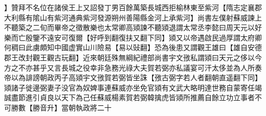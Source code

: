 】贊拜不名位在諸侯王上又詔發丁男百餘萬築長城西拒榆林東至紫河【隋志定襄郡大利縣有隂山有紫河通典紫河發源朔州善陽縣金河上承紫河】尚書左僕射蘇威諫上不聽築之二旬而畢帝之徵散樂也太常卿高熲諫不聽熲退謂太常丞李懿曰周天元以好樂而亡殷鑒不遠安可復爾【好呼到翻復扶又翻下同】熲又以帝遇啟民過厚謂太府卿何稠曰此虜頗知中國虚實山川險易【易以䜴翻】恐為後患又謂觀王雄曰【雄自安德郡王改封觀王觀古玩翻】近來朝廷殊無綱紀禮部尚書宇文㢸私謂熲曰天元之侈以今方之不亦甚乎又言長城之役幸非急務光祿大夫賀若弼亦私議宴可汗太侈並為人所奏帝以為誹謗朝政丙子高熲宇文㢸賀若弼皆坐誅【㢸古弼字若人者翻朝直遥翻下同】熲諸子徙邊弼妻子没官為奴婢事連蘇威亦坐免官熲有文武大略明達世務自蒙寄任竭誠盡節進引貞良以天下為己任蘇威楊素賀若弼韓擒虎皆熲所推薦自餘立功立事者不可勝數【勝音升】當朝執政將二十
